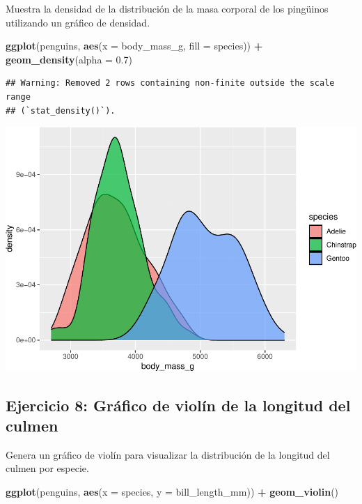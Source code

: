 \documentclass[
]{book}
\newenvironment{Shaded}{\begin{snugshade}}{\end{snugshade}}
\newcommand{\AttributeTok}[1]{\textcolor[rgb]{0.13,0.29,0.53}{#1}}
\newcommand{\FloatTok}[1]{\textcolor[rgb]{0.00,0.00,0.81}{#1}}
\newcommand{\FunctionTok}[1]{\textcolor[rgb]{0.13,0.29,0.53}{\textbf{#1}}}
\newcommand{\NormalTok}[1]{#1}
\newcommand{\SpecialCharTok}[1]{\textcolor[rgb]{0.81,0.36,0.00}{\textbf{#1}}}
\begin{document}
Muestra la densidad de la distribución de la masa corporal de los pingüinos utilizando un gráfico de densidad.

\begin{Shaded}
\begin{Highlighting}[]
\FunctionTok{ggplot}\NormalTok{(penguins, }\FunctionTok{aes}\NormalTok{(}\AttributeTok{x =}\NormalTok{ body\_mass\_g, }\AttributeTok{fill =}\NormalTok{ species)) }\SpecialCharTok{+}
  \FunctionTok{geom\_density}\NormalTok{(}\AttributeTok{alpha =} \FloatTok{0.7}\NormalTok{)}
\end{Highlighting}
\end{Shaded}

\begin{verbatim}
## Warning: Removed 2 rows containing non-finite outside the scale range
## (`stat_density()`).
\end{verbatim}

\includegraphics{bookdown-demo_files/figure-latex/unnamed-chunk-206-1.pdf}

\hypertarget{ejercicio-8-gruxe1fico-de-violuxedn-de-la-longitud-del-culmen-1}{%
\subsection{Ejercicio 8: Gráfico de violín de la longitud del culmen}\label{ejercicio-8-gruxe1fico-de-violuxedn-de-la-longitud-del-culmen-1}}

Genera un gráfico de violín para visualizar la distribución de la longitud del culmen por especie.

\begin{Shaded}
\begin{Highlighting}[]
\FunctionTok{ggplot}\NormalTok{(penguins, }\FunctionTok{aes}\NormalTok{(}\AttributeTok{x =}\NormalTok{ species, }\AttributeTok{y =}\NormalTok{ bill\_length\_mm)) }\SpecialCharTok{+}
  \FunctionTok{geom\_violin}\NormalTok{()}
\end{Highlighting}
\end{Shaded}
\end{document}
